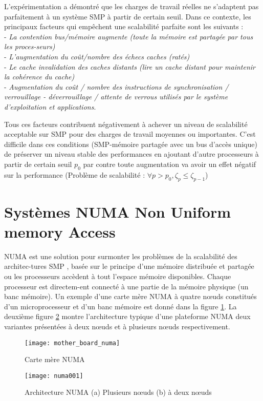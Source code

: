L'expérimentation a démontré que les charges de travail réelles ne s'adaptent pas parfaitement à un système SMP à partir de certain seuil. 
Dans ce contexte, les principaux facteurs qui empêchent une scalabilité parfaite sont les suivants :\\
%
- \textit{La contention bus/mémoire augmente (toute la mémoire est partagée par tous les proces-seurs)}\\
- \textit{L'augmentation du coût/nombre des échecs caches (ratés)}\\
- \textit{Le cache invalidation des caches distants (lire un cache distant pour maintenir la cohérence du cache)}\\
- \textit{Augmentation du coût / nombre des instructions de synchronisation / verrouillage - déverrouillage / attente de verrous utilisés par le système d'exploitation et applications}.

Tous ces facteurs contribuent négativement à achever un niveau de scalabilité acceptable sur SMP pour des charges de travail moyennes ou importantes. 
C'est difficile dans ces conditions (SMP-mémoire partagée avec un bus d'accès unique) de préserver un niveau stable des performances en ajoutant d'autre processeurs à partir de certain seuil $p_0$ par contre toute augmentation va avoir un effet négatif sur la performance 
(Problème de scalabilité : $ \forall p > p_0, \zeta_p \leq \zeta_{p-1}$)
\section{Systèmes NUMA Non Uniform memory Access}
%
NUMA est une solution pour surmonter les problèmes de la scalabilité des architec-tures SMP \cite{lak-pan}, basée sur le principe d'une mémoire distribuée et partagée ou les processeurs accèdent à tout l'espace mémoire disponibles.
Chaque processeur est directem-ent connecté à une partie de la mémoire physique (un banc mémoire). Un exemple d'une carte mère NUMA  à quatre nœuds constitués d'un microprocesseur et d'un banc mémoire est donné dans la figure \ref{fig:FG_2_6}. La deuxième figure \ref{fig:FG_2_7} montre l'architecture typique d'une plateforme NUMA deux variantes présentées à deux nœuds et à plusieurs nœuds respectivement.
%
\begin{figure}[h]
\texttt{[image: mother\_board\_numa]}
\centering
\caption{Carte mère NUMA}  %
\label{fig:FG_2_6}
\end{figure}
%
\begin{figure}[h]
\texttt{[image: numa001]}
\centering
\caption{Architecture NUMA (a) Plusieurs nœuds (b) à deux nœuds }  %
\label{fig:FG_2_7}
\end{figure}
%
